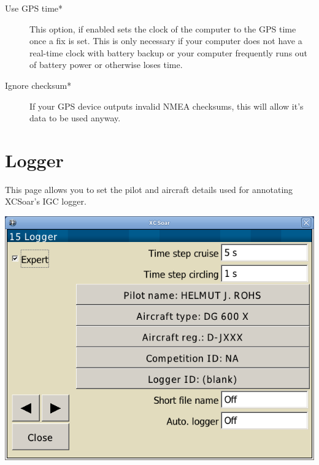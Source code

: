 \begin{description}
\item[Use GPS time*] This option, if enabled sets the clock of the computer to 
  the GPS time once a fix is set. This is only necessary if your computer does 
  not have a real-time clock with battery backup or your computer 
  frequently runs out of battery power or otherwise loses time.
\item[Ignore checksum*] If your GPS device outputs invalid NMEA checksums, this 
  will allow it's data to be used anyway.
\end{description}


\clearpage
\section{Logger}

This page allows you to set the pilot and aircraft details used for
annotating XCSoar's IGC logger. 

\begin{center}
\includegraphics[angle=0,width=0.8\linewidth,keepaspectratio='true']{figures/config-logger.png}
\end{center}

